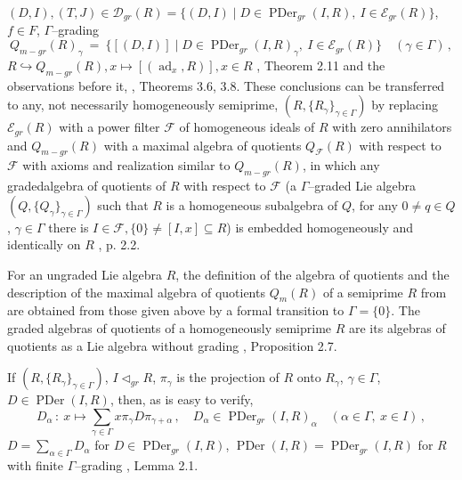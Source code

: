\documentclass[a4paper,11pt]{article}
\DeclareMathOperator{\ad}{ad}
\DeclareMathOperator{\PDer}{PDer}
\begin{document}
${(D, I), (T, J)\in \mathcal{D}_{gr}(R)=\{(D, I)\mid D\in \PDer_{gr}(I, R),\ 
I\in \mathcal{E}_{gr}(R)\}}$, ${f\in F}$, $\Gamma$--grading
\[
Q_{m-gr}(R)_{\gamma}\ =\ \{[(D, I)]\mid D\in \PDer_{gr}(I, R)_{\gamma},\ 
I\in \mathcal{E}_{gr}(R)\}\quad (\gamma\in \Gamma)\,, 
\]
${R \hookrightarrow Q_{m-gr}(R), x\longmapsto [(\ad_x, R)], x\in R}$ 
\cite{OMol}, Theorem 2.11 and the observations before it, \cite{Mol}, 
Theorems 3.6, 3.8. These conclusions can be transferred to any, not necessarily 
homogeneously semiprime, ${(R, \{R_{\gamma}\}_{\gamma\in \Gamma})}$ by 
replacing $\mathcal{E}_{gr}(R)$ with a power filter $\mathcal{F}$ of 
homogeneous ideals of $R$ with zero annihilators and $Q_{m-gr}(R)$ with a 
maximal algebra of quotients $Q_{\mathcal{F}}(R)$ with respect to 
$\mathcal{F}$ with axioms and realization similar to $Q_{m-gr}(R)$, in which 
any graded\linebreak algebra of quotients of $R$ with respect to $\mathcal{F}$ 
(a $\Gamma$--graded Lie algebra ${(Q, \{Q_{\gamma}\}_{\gamma\in \Gamma})}$ such 
that $R$ is a homogeneous subalgebra of $Q$, for any ${0\ne q\in Q}$, 
${\gamma\in \Gamma}$ there is ${I\in \mathcal{F}, 
\{0\}\ne [I, x]\subseteq R}$) is embedded homogeneously and identically on 
$R$ \cite{JMQ}, p. 2.2.

For an ungraded Lie algebra $R$, the definition of the algebra of quotients 
and the description of the maximal algebra of quotients $Q_m(R)$ of a 
semiprime $R$ from \cite{Mol} are obtained from those given above by a 
formal transition to ${\Gamma=\{0\}}$. The graded algebras of quotients of 
a homogeneously semiprime $R$ are its algebras of quotients as a Lie algebra 
without grading \cite{OMol}, Proposition 2.7.

If ${(R, \{R_{\gamma}\}_{\gamma\in \Gamma})}$, ${I\lhd_{gr} R}$, $\pi_{\gamma}$ 
is the projection of $R$ onto $R_{\gamma}$, ${\gamma\in \Gamma}$, 
${D\in \PDer(I, R)}$, then, as is easy to verify,  
\[
D_{\alpha}\,:\ x\longmapsto 
\sum_{\gamma\in \Gamma} x \pi_{\gamma} D \pi_{\gamma+\alpha}\,,\quad
D_{\alpha}\in \PDer_{gr}(I, R)_{\alpha}\quad 
(\alpha\in \Gamma,\ x\in I)\,,
\] 
${D=\sum\limits_{\alpha\in \Gamma} D_{\alpha}}$ for ${D\in \PDer_{gr}(I, R)}$, 
${\PDer(I, R)=\PDer_{gr}(I, R)}$ for $R$ with finite $\Gamma$--grading 
\cite{QTS}, Lemma 2.1. 
\end{document}
